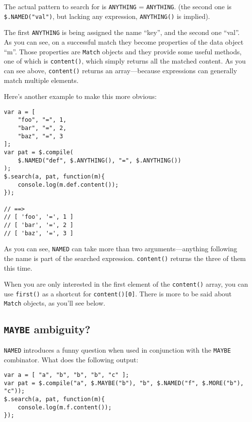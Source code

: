 \documentclass[a4paper,10pt]{article}
\begin{document}
The actual pattern to search for is \texttt{ANYTHING} = \texttt{ANYTHING}.  (the second
one is \texttt{\$.NAMED("val")}, but lacking any expression, \texttt{ANYTHING()} is
implied).

The first \texttt{ANYTHING} is being assigned the name “key”, and the second one
“val”.  As you can see, on a successful match they become properties of the
data object “m”.  Those properties are \texttt{Match} objects and they provide some
useful methods, one of which is \texttt{content()}, which simply returns all the
matched content.  As you can see above, \texttt{content()} returns an array—because
expressions can generally match multiple elements.

Here's another example to make this more obvious:


\begin{verbatim}
var a = [
    "foo", "=", 1,
    "bar", "=", 2,
    "baz", "=", 3
];
var pat = $.compile(
    $.NAMED("def", $.ANYTHING(), "=", $.ANYTHING())
);
$.search(a, pat, function(m){
    console.log(m.def.content());
});

// ==>
// [ 'foo', '=', 1 ]
// [ 'bar', '=', 2 ]
// [ 'baz', '=', 3 ]
\end{verbatim}

As you can see, \texttt{NAMED} can take more than two arguments—anything
following the name is part of the searched expression.  \texttt{content()} returns
the three of them this time.

When you are only interested in the first element of the \texttt{content()} array,
you can use \texttt{first()} as a shortcut for \texttt{content()[0]}.  There is more to be
said about \texttt{Match} objects, as you'll see below.
\subsection{\texttt{MAYBE} ambiguity?}
\label{sec-2-7}


\texttt{NAMED} introduces a funny question when used in conjunction with the
\texttt{MAYBE} combinator.  What does the following output:


\begin{verbatim}
var a = [ "a", "b", "b", "b", "c" ];
var pat = $.compile("a", $.MAYBE("b"), "b", $.NAMED("f", $.MORE("b"), "c"));
$.search(a, pat, function(m){
    console.log(m.f.content());
});
\end{verbatim}
\end{document}
